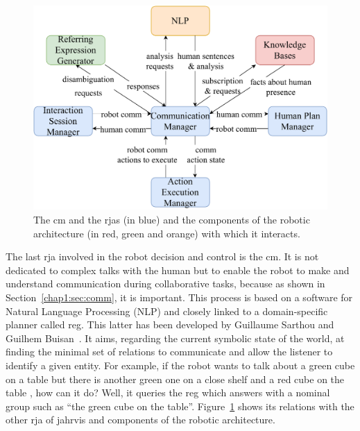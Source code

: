 \documentclass[a4paper,11pt,twoside]{StyleThese}
\begin{document}
\begin{figure}[!hbt]
	\centering
	\includegraphics[width=0.85\linewidth]{figures/chapter2/comm_manager_zoom.pdf}
	\caption{The \acrlong{cm} and the \acrshort{rja}s (in blue) and the components of the robotic architecture (in red, green and orange) with which it interacts.}
	\label{chap6:fig:comm_manager_zoom}
\end{figure}

The last \acrshort{rja} involved in the robot decision and control is the \acrfull{cm}. It is not dedicated to complex talks with the human but to enable the robot to make and understand communication during collaborative tasks, because as shown in Section~\ref{chap1:sec:comm}, it is important. This process is based on a software for Natural Language Processing (NLP) and closely linked to a domain-specific planner called \acrfull{reg}. This latter has been developed by Guillaume Sarthou and Guilhem Buisan~\cite{buisan_2020_efficient}. It aims, regarding the current symbolic state of the world, at finding the minimal set of relations to communicate and allow the listener to identify a given entity. For example, if the robot wants to talk about a green cube on a table but there is another green one on a close shelf and a red cube on the table , how can it do? Well, it queries the \acrshort{reg} which answers with a nominal group such as ``the green cube on the table''. Figure~\ref{chap6:fig:comm_manager_zoom} shows its relations with the other \acrshort{rja} of \acrshort{jahrvis} and components of the robotic architecture.
\end{document}
